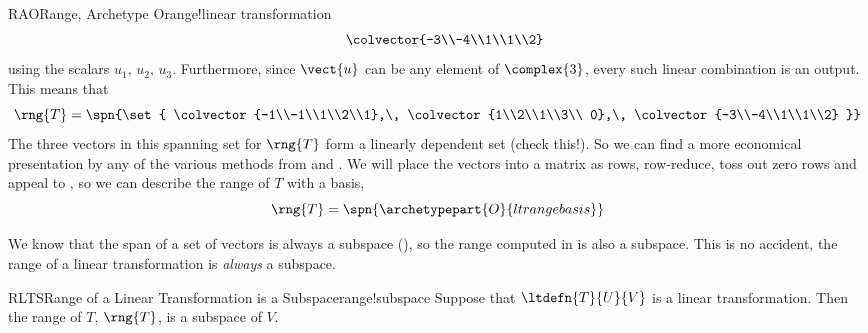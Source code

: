 \begin{example}{RAO}{Range, Archetype O}{range!linear transformation}
\begin{align*}
&&
\colvector{-3\\-4\\1\\1\\2}
\end{align*}
%
using the scalars $u_1,\,u_2,\,u_3$.  Furthermore, since $\vect{u}$ can be any element of $\complex{3}$, every such linear combination is an output.  This means that 
%
\begin{equation*}
\rng{T}=\spn{\set{
\colvector{-1\\-1\\1\\2\\1},\,
\colvector{1\\2\\1\\3\\ 0},\,
\colvector{-3\\-4\\1\\1\\2}
}}
\end{equation*}
%
The three vectors in this spanning set for $\rng{T}$ form a linearly dependent set (check this!).  So we can find a more economical presentation by any of the various methods from  and .  We will place the vectors into a matrix as rows, row-reduce, toss out zero rows and appeal to , so we can describe the range of $T$ with a basis,
%
\begin{equation*}
\rng{T}=\spn{\archetypepart{O}{ltrangebasis}}
\end{equation*}
%
\end{example}
%
We know that the span of a set of vectors is always a subspace (), so the range computed in  is also a subspace.  This is no accident, the range of a linear transformation is {\em always} a subspace.
%
%
\begin{theorem}{RLTS}{Range of a Linear Transformation is a Subspace}{range!subspace}
Suppose that $\ltdefn{T}{U}{V}$ is a linear transformation.  Then the range of $T$, $\rng{T}$, is a subspace of $V$.
\end{theorem}
%
